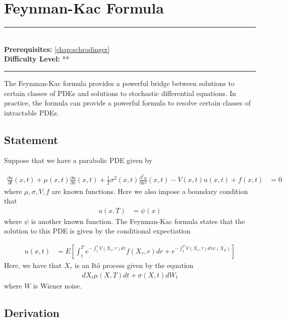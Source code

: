 \documentclass[book.tex]{subfiles}
\begin{document}
\chapter{Feynman-Kac Formula}

\label{chap:perturbation_theory}
\noindent\rule{11cm}{0.4pt} \\
\textbf{Prerequisites:} \autoref{chap:schrodinger} \\
\textbf{Difficulty Level:} ** \\
\noindent\rule{11cm}{0.4pt}
\vspace{5mm}
The Feynman-Kac formula provides a powerful bridge between solutions to certain classes of PDEs and solutions to stochastic differential equations. In practice, the formula can provide a powerful formula to resolve certain classes of intractable PDEs.

\section{Statement}

Suppose that we have a parabolic PDE given by

\begin{align}
\frac{\partial u}{\partial t}(x, t) + \mu(x, t)\frac{\partial u}{\partial x}(x, t) + \frac{1}{2}\sigma^2(x, t)\frac{\partial^2 u}{\partial x^2}(x, t) - V(x, t)u(x, t) + f(x, t) &= 0
\end{align}
where $\mu, \sigma, V, f$ are known functions. Here we also impose a boundary condition that
\begin{align}
u(x, T) &= \psi(x)
\end{align}
where $\psi$ is another known function. The Feynman-Kac formula states that the solution to this PDE is given by the conditional expectiation

\begin{align}
u(x, t) &= E\left [ \int_t^T e^{-\int_t^r V(X_\tau, \tau) d \tau } f(X_\tau, r) dr + e^{- \int_t^T V(X_\tau, \tau) d \tau \psi(X_T)}  \right ]
\end{align}
Here, we have that $X_\tau$ is an It\^{o} process given by the equation
\begin{align}
d X_t \mu(X, T) dt + \sigma(X, t) dW_t
\end{align}
where $W$ is Wiener noise.
\section{Derivation}
\end{document}
